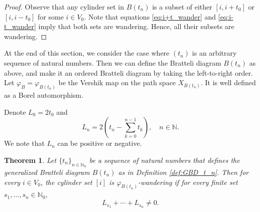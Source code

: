 \documentclass[11pt,reqno]{amsart}
\theoremstyle{definition}
\theoremstyle{remark}
\theoremstyle{plain}
\newtheorem{theorem}[definition]{Theorem}
\newcommand{\N}{\mathbb N}
\numberwithin{equation}{section}
\begin{document}
\begin{proof} Observe that any cylinder set in $B(t_n)$ is a subset of either $[i,i+t_0]$ or $[i,i-t_0]$ for some $i \in V_0$. Note that equations \eqref{eq:i+t_wander} and \eqref{eq:i-t_wander} imply that both sets are wandering. Hence, all their subsets are wandering.
\end{proof}

At the end of this section, we consider the case where $(t_n)$ is an arbitrary sequence of natural numbers. Then we can define the Bratteli diagram $B(t_n)$ as above, and make it an ordered Bratteli diagram by taking the left-to-right order. Let $\varphi_B= \varphi_{B(t_n)}$ be the Vershik map on the path space $X_{B(t_n)}$. It is well defined as a Borel automorphism.

Denote $L_0 = 2 t_0$ and
\begin{equation}\label{eq:def_Ln}
   L_n = 2(t_n - \sum_{k=0}^{n-1}t_k), \quad n \in \N.
\end{equation}
We note that $L_n$ can be positive or negative. 

\begin{theorem}\label{Thm:wand_1} Let $\{t_{n}\}_{n\in \N_0}$ be a sequence of natural numbers that defines the generalized Bratteli diagram $B(t_n)$ as in Definition \ref{def:GBD_t_n}. 
Then for every $i \in V_0$, the cylinder set $[i]$ is $\varphi_{B(t_n)}$-wandering if for every finite set $s_1, \ldots, 
s_n \in \N_0$,  
$$
L_{s_1}+\cdots+L_{s_n} \neq 0.
$$
\end{theorem}
\end{document}
